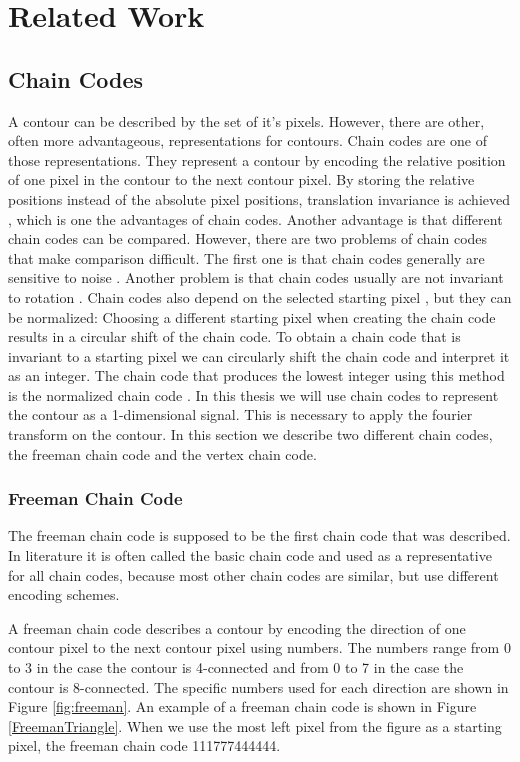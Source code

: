 \documentclass[thesis.tex]{subfiles}
\begin{document}
\chapter{Related Work}

\section{Chain Codes} \label{chain_codes}
A contour can be described by the set of it's pixels. However, there are other, often more advantageous, representations for contours. Chain codes are one of those representations. They represent a contour by encoding the relative position of one pixel in the contour to the next contour pixel. By storing the relative positions instead of the absolute pixel positions, translation invariance is achieved \cite{yang2008su}, which is one the advantages of chain codes. Another advantage is that different chain codes can be compared. However, there are two problems of chain codes that make comparison difficult. The first one is that chain codes generally are sensitive to noise \cite{yang2008su}. Another problem is that chain codes usually are not invariant to rotation \cite{yang2008su}. Chain codes also depend on the selected starting pixel \cite{Ballard:1982:CV:578131}, but they can be normalized: Choosing a different starting pixel when creating the chain code results in a circular shift of the chain code. To obtain a chain code that is invariant to a starting pixel we can circularly shift the chain code and interpret it as an integer. The chain code that produces the lowest integer using this method is the normalized chain code \cite{Ballard:1982:CV:578131}. In this thesis we will use chain codes to represent the contour as a 1-dimensional signal. This is necessary to apply the fourier transform on the contour. In this section we describe two different chain codes, the freeman chain code and the vertex chain code.    

\subsection{Freeman Chain Code} \label{freeman}
The freeman chain code \cite{freeman} is supposed to be the first chain code that was described. In literature it is often called the basic chain code and used as a representative for all chain codes, because most other chain codes are similar, but use different encoding schemes. 

A freeman chain code describes a contour by encoding the direction of one contour pixel to the next contour pixel using numbers. The numbers range from 0 to 3 in the case the contour is 4-connected and from 0 to 7 in the case the contour is 8-connected. The specific numbers used for each direction are shown in Figure \ref{fig:freeman}. An example of a freeman chain code is shown in Figure \ref{FreemanTriangle}. When we use the most left pixel from the figure as a starting pixel, the freeman chain code 111777444444.
\end{document}
